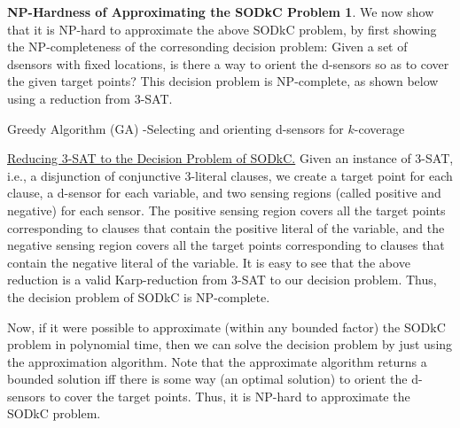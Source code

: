 \documentclass[conference]{IEEEtran}
\theoremstyle{definition}
\newtheorem*{NP-Hardness of Approximating the SODkC Problem}{NP-Hardness of Approximating the SODkC Problem}
\newtheorem*{Greedy Algorithm (GA)}{Greedy Algorithm (GA)}
\newtheorem*{GA on the Running Example}{GA on the Running Example}
\newtheorem*{Performance Guarantee of GA}{Performance Guarantee of GA}
\begin{document}
\begin{NP-Hardness of Approximating the SODkC Problem}
We now show that it is NP-hard to approximate the above SODkC problem, by first showing the NP-completeness of the corresonding decision problem: Given a set of dsensors with fixed locations, is there a way to orient the d-sensors so as to cover the given target points? This decision problem is NP-complete, as shown below using a reduction from 3-SAT.

\begin{algorithm}[t]
    \caption{Greedy Algorithm (GA) -Selecting and orienting d-sensors for $k$-coverage}
\end{algorithm}

\noindent\underline{Reducing 3-SAT to the Decision Problem of SODkC.} Given an instance of 3-SAT, i.e., a disjunction of conjunctive 3-literal clauses, we create a target point for each clause, a d-sensor for each variable, and two sensing regions (called positive and negative) for each sensor. The positive sensing region covers all the target points corresponding to clauses that contain the positive literal of the variable, and the negative sensing region covers all the target points corresponding to clauses that contain the negative literal of the variable. It is easy to see that the above reduction is a valid Karp-reduction from 3-SAT to our decision problem. Thus, the decision problem of SODkC is NP-complete.
\end{NP-Hardness of Approximating the SODkC Problem}


Now, if it were possible to approximate (within any bounded factor) the SODkC problem in polynomial time, then we can solve the decision problem by just using the approximation algorithm. Note that the approximate algorithm returns a bounded solution iff there is some way (an optimal solution) to orient the d-sensors to cover the target points. Thus, it is NP-hard to approximate the SODkC problem.

\end{document}
